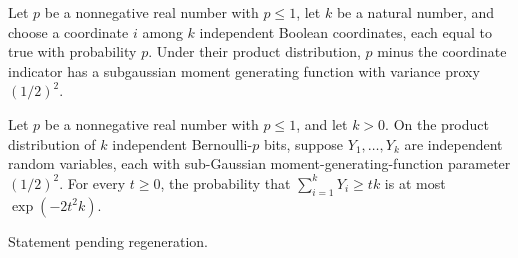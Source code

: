 \begin{theorem}
\label{Randomized.hasSubgaussianMGF_sub_coordIndicator}
\leanok
{}
Let $p$ be a nonnegative real number with $p\leq 1$, let $k$ be a natural number, and
choose a coordinate $i$ among $k$ independent Boolean coordinates, each equal to true
with probability $p$. Under their product distribution, $p$ minus the coordinate
indicator has a subgaussian moment generating function with variance proxy $(1/2)^2$.
\end{theorem}

\begin{theorem}
\label{Randomized.iidBernoulli_tail_le}
\leanok
{}
Let $p$ be a nonnegative real number with $p\le 1$, and let $k>0$. On the product
distribution of $k$ independent Bernoulli-$p$ bits, suppose $Y_1,\ldots,Y_k$ are
independent random variables, each with sub-Gaussian moment-generating-function
parameter $(1/2)^2$. For every $t\ge 0$, the probability that $\sum_{i=1}^k Y_i\ge tk$
is at most $\exp(-2t^2k)$.
\end{theorem}

\begin{theorem}
\label{Randomized.iid_bernoulli_avg_concentration}
\leanok
{}
Statement pending regeneration.
\end{theorem}

